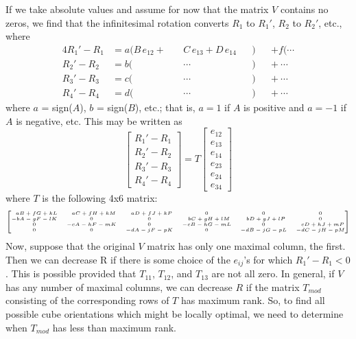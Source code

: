 If we take absolute values and assume for now that the matrix $V$ contains no
zeros, we find that the infinitesimal rotation converts $R_1$ to $R_1'$, $R_2$
to $R_2'$, etc., where
\begin{alignat*}{4}
R_1' - R_1 & = a(B \, e_{12} + &&\:C \, e_{13} + D \, e_{14}&&) &&+ f (\cdots \\
R_2' - R_2 & = b(              &&~\cdots                    &&) &&+ ~\cdots \\
R_3' - R_3 & = c(              &&~\cdots                    &&) &&+ ~\cdots \\
R_4' - R_4 & = d(              &&~\cdots                    &&) &&+ ~\cdots
\end{alignat*}
where $a$ = sign($A$), $b$ = sign($B$), etc.; that is, $a = 1$ if $A$ is
positive and $a = -1$ if $A$ is negative, etc.  This may be written as
\begin{equation*}
\begin{bmatrix}
R_1' - R_1 \\
R_2' - R_2 \\
R_3' - R_3 \\
R_4' - R_4 
\end{bmatrix}
= T
\begin{bmatrix}
e_{12} \\
e_{13} \\
e_{14} \\
e_{23} \\
e_{24} \\
e_{34} 
\end{bmatrix}
\end{equation*}
where $T$ is the following 4x6 matrix:
\begin{equation*}
\tiny
\begin{bmatrix}
~~aB+fG+kL & ~~aC+fH+kM & ~~aD+fJ+kP &      0     &      0     &      0     \\
 -bA-gF-lK &      0     &      0     & ~~bC+gH+lM & ~~bD+gJ+lP &      0     \\
     0     &  -cA-hF-mK &      0     &  -cB-hG-mL &      0     & ~~cD+hJ+mP \\
     0     &      0     &  -dA-jF-pK &      0     &  -dB-jG-pL &  -dC-jH-pM
\end{bmatrix}
\normalsize
\label{refpage10}
\end{equation*}
Now, suppose that the original $V$ matrix has only one maximal column, the
first.  Then we can decrease R if there is some choice of the $e_{ij}$'s for
which $R_1' - R_1 < 0$.  This is possible provided that $T_{11}$, $T_{12}$,
and $T_{13}$ are not all zero.  In general, if $V$ has any number of maximal
columns, we can decrease $R$ if the matrix $T_{mod}$ consisting of the
corresponding rows of $T$ has maximum rank.  So, to find all possible cube
orientations which might be locally optimal, we need to determine when
$T_{mod}$ has less than maximum rank.

